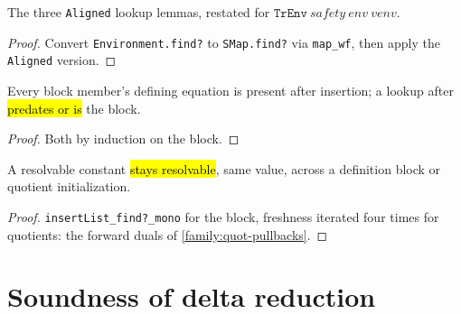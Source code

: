 \begin{lemma}
\label{family:tr-env-find}
\leanok
{}

 The three \texttt{Aligned} lookup lemmas, restated for
$\mathtt{TrEnv}\ safety\ env\ venv$.
\end{lemma}
\begin{proof}
\leanok
{} Convert \texttt{Environment.find?} to \texttt{SMap.find?} via \texttt{map\_wf},
then apply the \texttt{Aligned} version.
\end{proof}

\begin{lemma}
\label{family:insert-defs-lookup}
\leanok
{}

 Every block member's defining equation is present after insertion; a lookup
after \hl{predates or is} the block.
\end{lemma}
\begin{proof}
\leanok
{} Both by induction on the block.
\end{proof}

\begin{lemma}
\label{family:forward-find-transport}
\leanok
{}

 A resolvable constant \hl{stays resolvable}, same value, across a
definition block or quotient initialization.
\end{lemma}
\begin{proof}
\leanok
{} \texttt{insertList\_find?\_mono} for the block, freshness iterated four times
for quotients: the forward duals of \ref{family:quot-pullbacks}.
\end{proof}

\section{Soundness of delta reduction}

